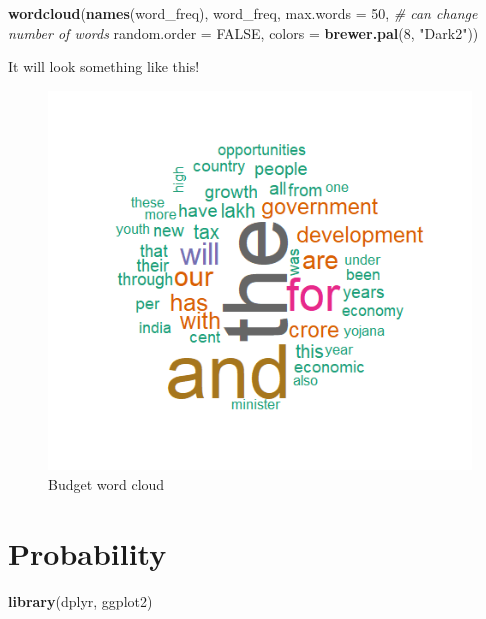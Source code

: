 \documentclass[
]{book}
\newenvironment{Shaded}{\begin{snugshade}}{\end{snugshade}}
\newcommand{\AttributeTok}[1]{\textcolor[rgb]{0.13,0.29,0.53}{#1}}
\newcommand{\CommentTok}[1]{\textcolor[rgb]{0.56,0.35,0.01}{\textit{#1}}}
\newcommand{\ConstantTok}[1]{\textcolor[rgb]{0.56,0.35,0.01}{#1}}
\newcommand{\DecValTok}[1]{\textcolor[rgb]{0.00,0.00,0.81}{#1}}
\newcommand{\FunctionTok}[1]{\textcolor[rgb]{0.13,0.29,0.53}{\textbf{#1}}}
\newcommand{\NormalTok}[1]{#1}
\newcommand{\StringTok}[1]{\textcolor[rgb]{0.31,0.60,0.02}{#1}}
\begin{document}
\begin{Shaded}
\begin{Highlighting}[]
\FunctionTok{wordcloud}\NormalTok{(}\FunctionTok{names}\NormalTok{(word\_freq), }
\NormalTok{          word\_freq, }\AttributeTok{max.words =} \DecValTok{50}\NormalTok{, }\CommentTok{\# can change number of words }
          \AttributeTok{random.order =} \ConstantTok{FALSE}\NormalTok{, }
          \AttributeTok{colors =} \FunctionTok{brewer.pal}\NormalTok{(}\DecValTok{8}\NormalTok{, }\StringTok{"Dark2"}\NormalTok{))}
\end{Highlighting}
\end{Shaded}

It will look something like this!

\begin{figure}

{\centering \includegraphics[width=1\linewidth]{pictures/budget_Speech} 

}

\caption{Budget word cloud}\label{fig:unnamed-chunk-64}
\end{figure}

\hypertarget{probability}{%
\chapter{Probability}\label{probability}}

\begin{Shaded}
\begin{Highlighting}[]
\FunctionTok{library}\NormalTok{(}\StringTok{\textquotesingle{}dplyr\textquotesingle{}}\NormalTok{, }\StringTok{\textquotesingle{}ggplot2\textquotesingle{}}\NormalTok{)}
\end{Highlighting}
\end{Shaded}
\end{document}
